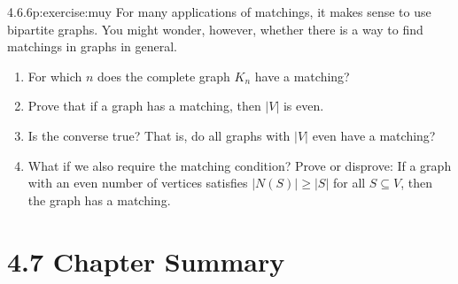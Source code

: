 \documentclass[twoside,11pt,]{book}
\numberwithin{equation}{chapter}
\newcommand{\card}[1]{\left| #1 \right|}
\begin{document}
\begin{divisionsolution}{4.6.6}{}{p:exercise:muy}%
For many applications of matchings, it makes sense to use bipartite graphs. You might wonder, however, whether there is a way to find matchings in graphs in general.%
\begin{enumerate}[label=(\alph*)]
\item{}For which \(n\) does the complete graph \(K_n\) have a matching?%
\item{}Prove that if a graph has a matching, then \(\card{V}\) is even.%
\item{}Is the converse true? That is, do all graphs with \(\card{V}\) even have a matching?%
\item{}What if we also require the matching condition? Prove or disprove: If a graph with an even number of vertices satisfies \(\card{N(S)} \ge \card{S}\) for all \(S \subseteq V\), then the graph has a matching.%
\end{enumerate}
%
\end{divisionsolution}%
\section*{4.7 Chapter Summary}
\end{document}

